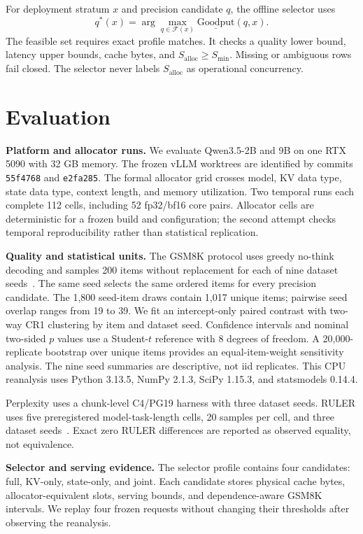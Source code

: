 \documentclass{article}
\begin{document}
For deployment stratum $x$ and precision candidate $q$, the offline selector
uses
\begin{equation}
q^*(x)=\arg\max_{q\in\mathcal{F}(x)}
\underline{\mathrm{Goodput}}(q,x).
\label{eq:selector}
\end{equation}
The feasible set requires exact profile matches. It checks a quality lower
bound, latency upper bounds, cache bytes, and
$S_{\mathrm{alloc}}\ge S_{\min}$. Missing or ambiguous rows fail closed.
The selector never labels $S_{\mathrm{alloc}}$ as operational concurrency.

\section{Evaluation}
\label{sec:setup}

\textbf{Platform and allocator runs.}
We evaluate Qwen3.5-2B and 9B on one RTX 5090 with 32 GB memory. The frozen
vLLM worktrees are identified by commits \texttt{55f4768} and
\texttt{e2fa285}. The formal allocator grid crosses model, KV data type,
state data type, context length, and memory utilization. Two temporal runs
each complete 112 cells, including 52 fp32/bf16 core pairs. Allocator cells
are deterministic for a frozen build and configuration; the second attempt
checks temporal reproducibility rather than statistical replication.

\textbf{Quality and statistical units.}
The GSM8K protocol uses greedy no-think decoding and samples 200 items without
replacement for each of nine dataset seeds~\cite{gsm8k}. The same seed selects
the same ordered items for every precision candidate. The 1,800 seed-item
draws contain 1,017 unique items; pairwise seed overlap ranges from 19 to 39.
We fit an intercept-only paired contrast with two-way CR1 clustering by item
and dataset seed. Confidence intervals and nominal two-sided $p$ values use a
Student-$t$ reference with 8 degrees of freedom. A 20,000-replicate bootstrap
over unique items provides an equal-item-weight sensitivity analysis. The
nine seed summaries are descriptive, not iid replicates. This CPU reanalysis
uses Python 3.13.5, NumPy 2.1.3, SciPy 1.15.3, and statsmodels 0.14.4.

Perplexity uses a chunk-level C4/PG19 harness with three dataset seeds. RULER
uses five preregistered model-task-length cells, 20 samples per cell, and three
dataset seeds~\cite{ruler}. Exact zero RULER differences are reported as
observed equality, not equivalence.

\textbf{Selector and serving evidence.}
The selector profile contains four candidates: full, KV-only, state-only, and
joint. Each candidate stores physical cache bytes, allocator-equivalent slots,
serving bounds, and dependence-aware GSM8K intervals. We replay four frozen
requests without changing their thresholds after observing the reanalysis.
\end{document}
